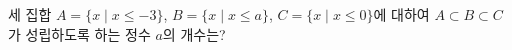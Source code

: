 세 집합 $A=\{x \mid x\le -3\}$, $B=\{x \mid x\le a\}$, $C=\{x \mid x\le 0\}$에 대하여 $A\subset B\subset C$가 성립하도록 하는 정수 $a$의 개수는?
